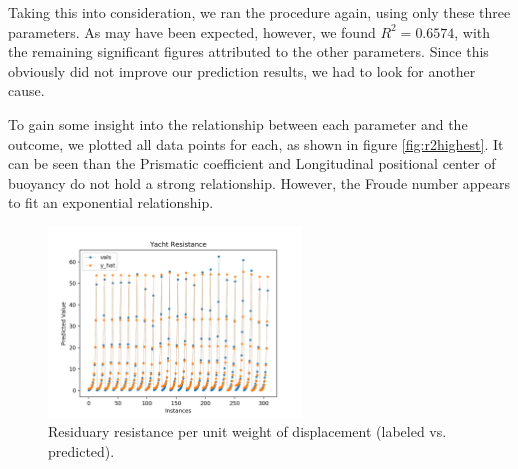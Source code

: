\documentclass[11pt,a4paper]{article}
\begin{document}
Taking this into consideration, we ran the procedure again, using only these three parameters. As may have been expected, however, we found $R^2 = 0.6574$, with the remaining significant figures attributed to the other parameters. Since this obviously did not improve our prediction results, we had to look for another cause.

To gain some insight into the relationship between each parameter and the outcome, we plotted all data points for each, as shown in figure \ref{fig:r2highest}. It can be seen than the Prismatic coefficient and Longitudinal positional center of buoyancy do not hold a strong relationship. However, the Froude number appears to fit an exponential relationship.

\begin{figure}
\centering
\includegraphics[width=0.6\textwidth]{yacht_best}
\caption{Residuary resistance per unit weight of displacement (labeled vs. predicted).}
\label{fig:yacht_best}
\end{figure}
\end{document}
